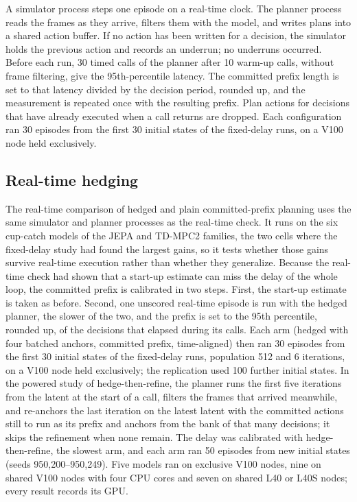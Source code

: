\documentclass[aps,physrev,\manuscriptlayout,superscriptaddress,
  longbibliography,amsmath,amssymb]{revtex4-2}
\begin{document}
A simulator process steps one episode on a real-time clock. The planner process reads the frames as they arrive, filters them with the model, and writes plans into a shared action buffer. If no action has been written for a decision, the simulator holds the previous action and records an underrun; no underruns occurred. Before each run, 30 timed calls of the planner after 10 warm-up calls, without frame filtering, give the 95th-percentile latency. The committed prefix length is set to that latency divided by the decision period, rounded up, and the measurement is repeated once with the resulting prefix. Plan actions for decisions that have already executed when a call returns are dropped. Each configuration ran 30 episodes from the first 30 initial states of the fixed-delay runs, on a V100 node held exclusively.

\subsection{Real-time hedging}\label{app:realtime2}

The real-time comparison of hedged and plain committed-prefix planning uses the same simulator and planner processes as the real-time check. It runs on the six cup-catch models of the JEPA and TD-MPC2 families, the two cells where the fixed-delay study had found the largest gains, so it tests whether those gains survive real-time execution rather than whether they generalize. Because the real-time check had shown that a start-up estimate can miss the delay of the whole loop, the committed prefix is calibrated in two steps. First, the start-up estimate is taken as before. Second, one unscored real-time episode is run with the hedged planner, the slower of the two, and the prefix is set to the 95th percentile, rounded up, of the decisions that elapsed during its calls. Each arm (hedged with four batched anchors, committed prefix, time-aligned) then ran 30 episodes from the first 30 initial states of the fixed-delay runs, population 512 and 6 iterations, on a V100 node held exclusively; the replication used 100 further initial states. In the powered study of hedge-then-refine, the planner runs the first five iterations from the latent at the start of a call, filters the frames that arrived meanwhile, and re-anchors the last iteration on the latest latent with the committed actions still to run as its prefix and anchors from the bank of that many decisions; it skips the refinement when none remain. The delay was calibrated with hedge-then-refine, the slowest arm, and each arm ran 50 episodes from new initial states (seeds 950,200--950,249). Five models ran on exclusive V100 nodes, nine on shared V100 nodes with four CPU cores and seven on shared L40 or L40S nodes; every result records its GPU.
\end{document}

